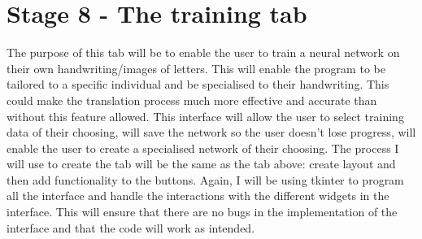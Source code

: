 \documentclass{report}
\begin{document}
\section{Stage 8 - The training tab}
The purpose of this tab will be to enable the user to train a neural network on their own handwriting/images of letters. This will enable the program to be tailored to a specific individual and be specialised to their handwriting. This could make the translation process much more effective and accurate than without this feature allowed. This interface will allow the user to select training data of their choosing, will save the network so the user doesn't lose progress, will enable the user to create a specialised network of their choosing. The process I will use to create the tab will be the same as the tab above: create layout and then add functionality to the buttons. Again, I will be using tkinter to program all the interface and handle the interactions with the different widgets in the interface. This will ensure that there are no bugs in the implementation of the interface and that the code will work as intended.
\end{document}
